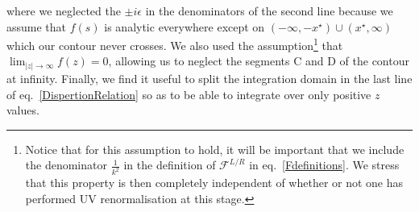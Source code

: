 \documentclass[11pt]{article}
\begin{document}
where we neglected the $\pm i \epsilon$ in the denominators of the second line because we assume that $f(s)$ is analytic everywhere except on $(-\infty,-x^\star)\cup(x^\star,\infty)$ which our contour never crosses. 
We also used the assumption\footnote{Notice that for this assumption to hold, it will be important that we include the denominator $\frac{1}{k^2}$ in the definition of $\mathcal{F}^{L/R}$ in eq.~\ref{Fdefinitions}. We stress that this property is then completely independent of whether or not one has performed UV renormalisation at this stage.} that $\lim_{|z| \rightarrow \infty} f(z) = 0$, allowing us to neglect the segments C and D of the contour at infinity. Finally, we find it useful to split the integration domain in the last line of eq.~\ref{DispertionRelation} so as to be able to integrate over only positive $z$ values.
\end{document}
